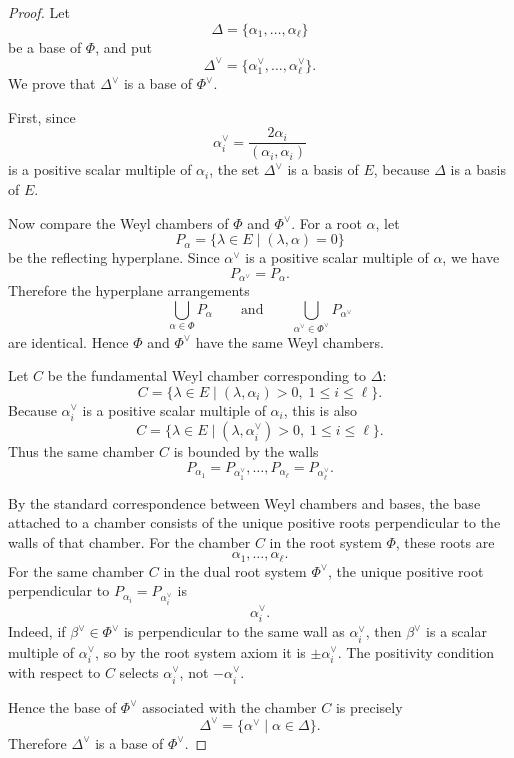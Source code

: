 \begin{proof}
    Let
    \[
        \Delta=\{\alpha_1,\ldots,\alpha_\ell\}
    \]
    be a base of \(\Phi\), and put
    \[
        \Delta^\vee=\{\alpha_1^\vee,\ldots,\alpha_\ell^\vee\}.
    \]
    We prove that \(\Delta^\vee\) is a base of \(\Phi^\vee\).
    
    First, since
    \[
        \alpha_i^\vee=\frac{2\alpha_i}{(\alpha_i,\alpha_i)}
    \]
    is a positive scalar multiple of \(\alpha_i\), the set \(\Delta^\vee\) is a basis
    of \(E\), because \(\Delta\) is a basis of \(E\).
    
    Now compare the Weyl chambers of \(\Phi\) and \(\Phi^\vee\). For a root
    \(\alpha\), let
    \[
        P_\alpha=\{\lambda\in E\mid (\lambda,\alpha)=0\}
    \]
    be the reflecting hyperplane. Since \(\alpha^\vee\) is a positive scalar multiple
    of \(\alpha\), we have
    \[
        P_{\alpha^\vee}=P_\alpha.
    \]
    Therefore the hyperplane arrangements
    \[
        \bigcup_{\alpha\in\Phi}P_\alpha
        \qquad\text{and}\qquad
        \bigcup_{\alpha^\vee\in\Phi^\vee}P_{\alpha^\vee}
    \]
    are identical. Hence \(\Phi\) and \(\Phi^\vee\) have the same Weyl chambers.
    
    Let \(C\) be the fundamental Weyl chamber corresponding to \(\Delta\):
    \[
        C=\{\lambda\in E\mid (\lambda,\alpha_i)>0,\;1\leq i\leq \ell\}.
    \]
    Because \(\alpha_i^\vee\) is a positive scalar multiple of \(\alpha_i\), this is
    also
    \[
        C=\{\lambda\in E\mid (\lambda,\alpha_i^\vee)>0,\;1\leq i\leq \ell\}.
    \]
    Thus the same chamber \(C\) is bounded by the walls
    \[
        P_{\alpha_1}=P_{\alpha_1^\vee},\ldots,
        P_{\alpha_\ell}=P_{\alpha_\ell^\vee}.
    \]
    
    By the standard correspondence between Weyl chambers and bases, the base
    attached to a chamber consists of the unique positive roots perpendicular to
    the walls of that chamber. For the chamber \(C\) in the root system \(\Phi\),
    these roots are
    \[
        \alpha_1,\ldots,\alpha_\ell.
    \]
    For the same chamber \(C\) in the dual root system \(\Phi^\vee\), the unique
    positive root perpendicular to \(P_{\alpha_i}=P_{\alpha_i^\vee}\) is
    \[
        \alpha_i^\vee.
    \]
    Indeed, if \(\beta^\vee\in\Phi^\vee\) is perpendicular to the same wall as
    \(\alpha_i^\vee\), then \(\beta^\vee\) is a scalar multiple of \(\alpha_i^\vee\),
    so by the root system axiom it is \(\pm\alpha_i^\vee\). The positivity condition
    with respect to \(C\) selects \(\alpha_i^\vee\), not \(-\alpha_i^\vee\).
    
    Hence the base of \(\Phi^\vee\) associated with the chamber \(C\) is precisely
    \[
        \Delta^\vee=\{\alpha^\vee\mid \alpha\in\Delta\}.
    \]
    Therefore \(\Delta^\vee\) is a base of \(\Phi^\vee\).
    \end{proof}

